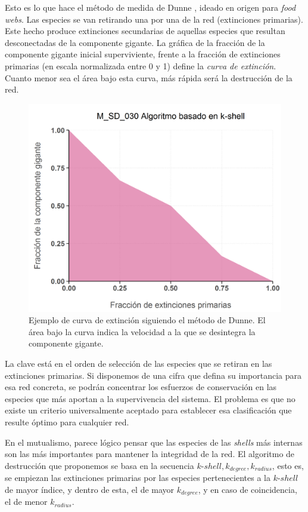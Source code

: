 Esto es lo que hace el método de medida de Dunne \cite{dunne2002biodiversity}, ideado en origen para \textit{food webs}. Las especies se van retirando una por una de la red (extinciones primarias). Este hecho produce extinciones secundarias de aquellas especies que resultan desconectadas de la componente gigante. La gráfica de la fracción de la componente gigante inicial superviviente, frente a la fracción de extinciones primarias (en escala normalizada entre 0 y 1) define la \textit{curva de extinción}. Cuanto menor sea el área bajo esta curva, más rápida será la destrucción de la red.

\begin{figure}[h!]
\centering
\includegraphics[scale=0.55]{Figures/ESTATICA_destruction_example.png}
\caption{Ejemplo de curva de extinción siguiendo el método de Dunne. El área bajo la curva indica la velocidad a la que se desintegra la componente gigante.}
\label{fig:ESTATICA_destruction_example}
\end{figure}

La clave está en el orden de selección de las especies que se retiran en las extinciones primarias. Si disponemos de una cifra que defina su importancia para esa red concreta, se podrán concentrar los esfuerzos de conservación en las especies que más aportan a la supervivencia del sistema. El problema es que no existe un criterio universalmente aceptado para establecer esa clasificación que resulte óptimo para cualquier red.

En el mutualismo, parece lógico pensar que las especies de las \textit{shells} más internas son las más importantes para mantener la integridad de la red. El algoritmo de destrucción que proponemos se basa en la secuencia $k$-$shell, k_{degree}, k_{radius}$, esto es, se empiezan las extinciones primarias por las especies pertenecientes a la $k$-$shell$ de mayor índice, y dentro de esta, el de mayor $k_{degree}$, y en caso de coincidencia, el de menor $k_{radius}$. 

